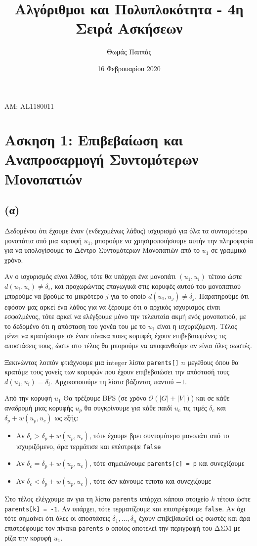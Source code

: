 \documentclass[a4paper,11pt]{article}
\begin{document}
\title{Αλγόριθμοι και Πολυπλοκότητα - 4η Σειρά Ασκήσεων}
\author{Θωμάς Παππάς}
\date{16 Φεβρουαρίου 2020}
\maketitle
\begin{center}ΑΜ: AL1180011\end{center}

\section*{Ασκηση 1: Επιβεβαίωση και Αναπροσαρμογή Συντομότερων Μονοπατιών}

\subsection*{(α)}
Δεδομένου ότι έχουμε έναν (ενδεχομένως λάθος) ισχυρισμό για όλα τα συντομότερα μονοπάτια από μια κορυφή $u_1$, μπορούμε να χρησιμοποιήσουμε αυτήν την πληροφορία για να υπολογίσουμε το Δέντρο Συντομότερων Μονοπατιών από το $u_1$ σε γραμμικό χρόνο.

Αν ο ισχυρισμός είναι λάθος, τότε θα υπάρχει ένα μονοπάτι $(u_1, u_i)$ τέτοιο ώστε $d(u_1, u_i) \neq \delta_i$, και προχωρώντας επαγωγικά στις κορυφές αυτού του μονοπατιού μπορούμε να βρούμε το μικρότερο $j$ για το οποίο $d(u_1, u_j) \neq \delta_j$. Παρατηρούμε ότι εφόσον μας αρκεί ένα λάθος για να ξέρουμε ότι ο αρχικός ισχυρισμός είναι εσφαλμένος, τότε αρκεί να ελέγξουμε μόνο την τελευταία ακμή ενός μονοπατιού, με το δεδομένο ότι η απόσταση του γονέα του με το $u_1$ είναι η ισχυριζόμενη. Τέλος μένει να κρατήσουμε σε έναν πίνακα ποιες κορυφές έχουν επιβεβαιωμένες τις αποστάσεις τους, ώστε στο τέλος θα μπορούμε να αποφανθούμε αν είναι όλες σωστές.

Ξεκινώντας λοιπόν φτιάχνουμε μια integer λίστα \verb|parents[]| $n$ μεγέθους όπου θα κρατάμε τους γονείς των κορυφών που έχουν επιβεβαιώσει την απόστασή τους $d(u_1, u_i) = \delta_i$. Αρχικοποιούμε τη λίστα βάζοντας παντού $-1$.

Από την κορυφή $u_1$ Θα τρέξουμε BFS (σε χρόνο $\mathcal{O}(|G|+|V|)$) και σε κάθε αναδρομή μιας κορυφής $u_p$ θα συγκρίνουμε για κάθε παιδί $u_c$ τις τιμές $\delta_c$ και $\delta_p + w(u_p,u_c)$ ως εξής:
\begin{itemize}
  \item Αν $\delta_c > \delta_p + w(u_p,u_c)$, τότε έχουμε βρει συντομότερο μονοπάτι από το ισχυριζόμενο, άρα τερμάτισε και επέστρεψε \verb|false|
  \item Αν $\delta_c = \delta_p + w(u_p,u_c)$, τότε σημειώνουμε \verb|parents[c] = p| και συνεχίζουμε
  \item Αν $\delta_c < \delta_p + w(u_p,u_c)$, τότε δεν κάνουμε τίποτα και συνεχίζουμε
\end{itemize}
Στο τέλος ελέγχουμε αν για τη λίστα \verb|parents| υπάρχει κάποιο στοιχείο $k$ τέτοιο ώστε \verb|parents[k] = -1|. Αν υπάρχει, τότε τερματίζουμε και επιστρέφουμε \verb|false|. Αν όχι τότε σημαίνει ότι όλες οι αποστάσεις $\delta_1, ..., \delta_n$ έχουν επιβεβαιωθεί ως σωστές και άρα επιστρέφουμε τον πίνακα \verb|parents| ο οποίος αποτελεί την περιγραφή του ΔΣΜ με ρίζα την κορυφή $u_1$.
\end{document}
